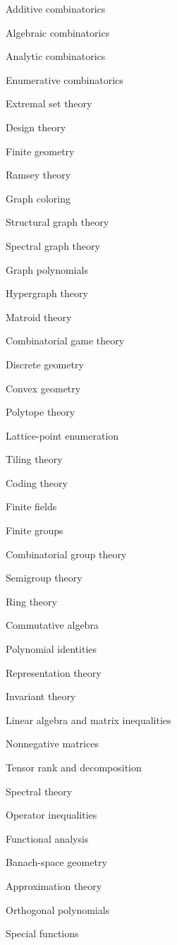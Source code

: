 \item Additive combinatorics
\item Algebraic combinatorics
\item Analytic combinatorics
\item Enumerative combinatorics
\item Extremal set theory
\item Design theory
\item Finite geometry
\item Ramsey theory
\item Graph coloring
\item Structural graph theory
\item Spectral graph theory
\item Graph polynomials
\item Hypergraph theory
\item Matroid theory
\item Combinatorial game theory
\item Discrete geometry
\item Convex geometry
\item Polytope theory
\item Lattice-point enumeration
\item Tiling theory
\item Coding theory
\item Finite fields
\item Finite groups
\item Combinatorial group theory
\item Semigroup theory
\item Ring theory
\item Commutative algebra
\item Polynomial identities
\item Representation theory
\item Invariant theory
\item Linear algebra and matrix inequalities
\item Nonnegative matrices
\item Tensor rank and decomposition
\item Spectral theory
\item Operator inequalities
\item Functional analysis
\item Banach-space geometry
\item Approximation theory
\item Orthogonal polynomials
\item Special functions
